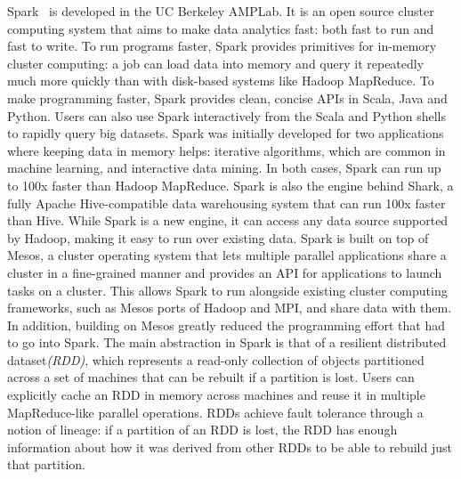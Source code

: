 \documentclass{llncs}
\begin{document}
Spark~\cite{zaharia2010spark} is developed in the UC Berkeley AMPLab. It is an open source cluster computing system that aims to make data analytics fast: both fast to run and fast to write.
To run programs faster, Spark provides primitives for in-memory cluster computing: a job can load data into memory and query it repeatedly much more quickly than with disk-based systems like Hadoop MapReduce.
To make programming faster, Spark provides clean, concise APIs in Scala, Java and Python. Users can also use Spark interactively from the Scala and Python shells to rapidly query big datasets.
Spark was initially developed for two applications where keeping data in memory helps: iterative algorithms, which are common in machine learning, and interactive data mining. In both cases, Spark can run up to 100x faster than Hadoop MapReduce. Spark is also the engine behind Shark, a fully Apache Hive-compatible data warehousing system that can run 100x faster than Hive. While Spark is a new engine, it can access any data source supported by Hadoop, making it easy to run over existing data.
Spark is built on top of Mesos, a cluster operating system that lets multiple parallel applications share a cluster in a fine-grained manner and provides an API for applications to launch tasks on a cluster.
This allows Spark to run alongside existing cluster computing frameworks, such as Mesos ports of Hadoop and MPI, and share data with them.
In addition, building on Mesos greatly reduced the programming effort that had to go into Spark.
The main abstraction in Spark is that of a resilient distributed dataset\textit{(RDD)}, which represents a read-only collection of objects partitioned across a set of machines that can be rebuilt if a partition is lost.
Users can explicitly cache an RDD in memory across machines and reuse it in multiple MapReduce-like parallel operations.
RDDs achieve fault tolerance through a notion of lineage: if a partition of an RDD is lost, the RDD has enough information about how it was derived from other RDDs to be able to rebuild just that partition.
\end{document}
